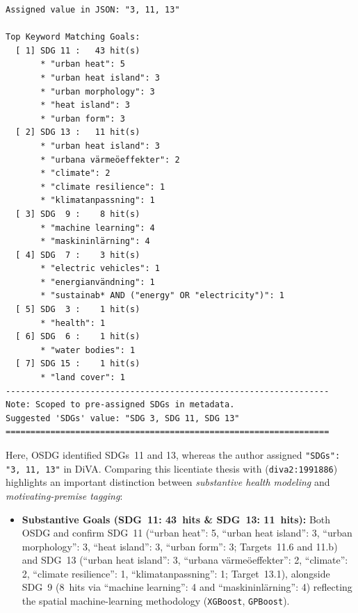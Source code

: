 \begin{casestudySection}
\begin{lstlisting}
Assigned value in JSON: "3, 11, 13"

Top Keyword Matching Goals:
  [ 1] SDG 11 :   43 hit(s)
       * "urban heat": 5
       * "urban heat island": 3
       * "urban morphology": 3
       * "heat island": 3
       * "urban form": 3
  [ 2] SDG 13 :   11 hit(s)
       * "urban heat island": 3
       * "urbana värmeöeffekter": 2
       * "climate": 2
       * "climate resilience": 1
       * "klimatanpassning": 1
  [ 3] SDG  9 :    8 hit(s)
       * "machine learning": 4
       * "maskininlärning": 4
  [ 4] SDG  7 :    3 hit(s)
       * "electric vehicles": 1
       * "energianvändning": 1
       * "sustainab* AND ("energy" OR "electricity")": 1
  [ 5] SDG  3 :    1 hit(s)
       * "health": 1
  [ 6] SDG  6 :    1 hit(s)
       * "water bodies": 1
  [ 7] SDG 15 :    1 hit(s)
       * "land cover": 1
-----------------------------------------------------------------
Note: Scoped to pre-assigned SDGs in metadata.
Suggested 'SDGs' value: "SDG 3, SDG 11, SDG 13"
=================================================================
\end{lstlisting}

Here, OSDG identified \glspl{SDG}~11 and 13, whereas the author assigned \texttt{"SDGs": "3, 11, 13"} in \gls{DiVA}. Comparing this licentiate thesis with  (\texttt{diva2:1991886}) highlights an important distinction between \emph{substantive health modeling} and \emph{motivating-premise tagging}:
\begin{itemize}
    \item \textbf{Substantive Goals (\gls{SDG}~11: \num{43}~hits \& \gls{SDG}~13: \num{11}~hits):} Both OSDG and  confirm \gls{SDG}~11 (\enquote{urban heat}: 5, \enquote{urban heat island}: 3, \enquote{urban morphology}: 3, \enquote{heat island}: 3, \enquote{urban form}: 3; Targets~11.6 and 11.b) and \gls{SDG}~13 (\enquote{urban heat island}: 3, \enquote{\foreignlanguage{swedish}{urbana värmeöeffekter}}: 2, \enquote{climate}: 2, \enquote{climate resilience}: 1, \enquote{\foreignlanguage{swedish}{klimatanpassning}}: 1; Target~13.1), alongside \gls{SDG}~9 (\num{8}~hits via \enquote{machine learning}: 4 and \enquote{\foreignlanguage{swedish}{maskininlärning}}: 4) reflecting the spatial machine-learning methodology (\texttt{XGBoost}, \texttt{GPBoost}).


\end{itemize}
\end{casestudySection}
